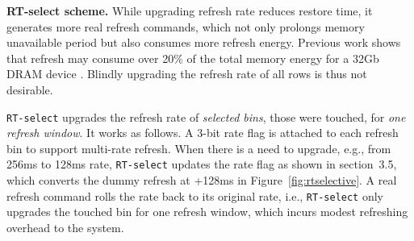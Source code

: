 
{\bf RT-select scheme.} 
While upgrading refresh rate reduces restore time, it generates more real refresh commands, which not only prolongs memory unavailable period but also consumes more refresh energy. 
Previous work shows that refresh may consume over 20\% of the total memory energy for a 32Gb DRAM device \cite{TC15:refresh, ISCA12:raidr}. Blindly upgrading the refresh rate of all rows is thus not desirable.

{\tt RT-select} upgrades the refresh rate of {\em selected bins}, those were touched, for {\em one refresh window}. It works as follows. 
A 3-bit rate flag is attached to each refresh bin to support multi-rate refresh. 
When there is a need to upgrade, e.g., from 256ms to 128ms rate, {\tt RT-select} updates the rate flag as shown in section~3.5, which converts the dummy refresh at +128ms in Figure~\ref{fig:rtselective}. 
A real refresh command rolls the rate back to its original rate, i.e., {\tt RT-select} only upgrades the touched bin for one refresh window, which incurs modest refreshing overhead to the system.


